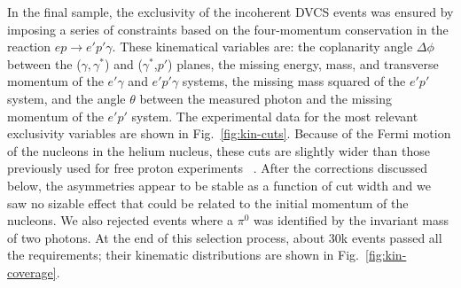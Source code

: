 \documentclass[twocolumn,nofootinbib,prl,superscriptaddress,secnumarabic,amssymb,nobibnotes,aps,floatfix]{revtex4}
\begin{document}
In the final sample, the exclusivity of the incoherent DVCS events was ensured 
by imposing a series of constraints based on the four-momentum conservation in 
the reaction $ep\rightarrow e'p'\gamma$.  These kinematical variables are: the 
coplanarity angle $\Delta\phi$ between the ($\gamma,\gamma^*$) and 
($\gamma^*$,$p'$) planes, the missing energy, mass, and transverse momentum of 
the $e'\gamma$ and $e'p'\gamma$ systems, the missing mass squared of the $e'p'$ 
system, and the angle $\theta$ between the measured photon and the missing 
momentum of the $e'p'$ system. The experimental data for the most relevant 
exclusivity variables are shown in Fig.~\ref{fig:kin-cuts}.  Because of the 
Fermi motion of the nucleons in the helium nucleus, these cuts
are slightly wider than those previously used for free proton experiments~%
\cite{Girod:2007aa}. After the corrections discussed below, the asymmetries 
appear to be stable as a function of cut width and we saw no sizable effect 
that could be related to the initial momentum of the nucleons. We also rejected 
events where a $\pi^0$ was identified by the invariant mass of two photons. At 
the end of this selection process, about 30k events passed all the 
requirements; their kinematic distributions are shown in 
Fig.~\ref{fig:kin-coverage}.  
\end{document}
